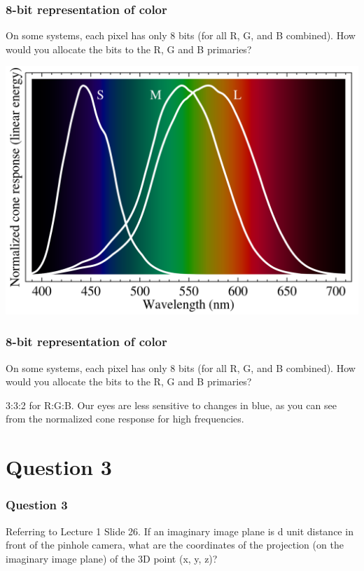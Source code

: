 \documentclass{beamer}
\begin{document}
\begin{frame}
    \frametitle{8-bit representation of color}
    On some systems, each pixel has only 8 bits (for all R, G, and B combined). 
    How would you allocate the bits to the R, G and B primaries?

    \begin{center}
        \includegraphics[scale=0.2]{images/cone-vision.png}
    \end{center}

\end{frame}

\begin{frame}
    \frametitle{8-bit representation of color}
    On some systems, each pixel has only 8 bits (for all R, G, and B combined). 
    How would you allocate the bits to the R, G and B primaries?

    \begin{tcolorbox}
        3:3:2 for R:G:B. Our eyes are less sensitive to changes in blue, 
        as you can see from the normalized cone response for high frequencies.
    \end{tcolorbox}

\end{frame}

\section{Question 3}

\begin{frame}
    \frametitle{Question 3}
    Referring to Lecture 1 Slide 26. If an imaginary image plane is d unit distance in front of the
    pinhole camera, what are the coordinates of the projection (on the imaginary image plane) of
    the 3D point (x, y, z)?
\end{frame}
\end{document}
